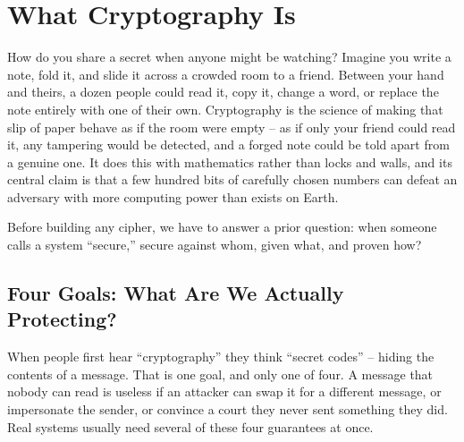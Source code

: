 \chapter{What Cryptography Is}

How do you share a secret when anyone might be watching? Imagine you write a note, fold it, and slide it across a crowded room to a friend. Between your hand and theirs, a dozen people could read it, copy it, change a word, or replace the note entirely with one of their own. Cryptography is the science of making that slip of paper behave as if the room were empty -- as if only your friend could read it, any tampering would be detected, and a forged note could be told apart from a genuine one. It does this with mathematics rather than locks and walls, and its central claim is that a few hundred bits of carefully chosen numbers can defeat an adversary with more computing power than exists on Earth.

Before building any cipher, we have to answer a prior question: when someone calls a system ``secure,'' secure against whom, given what, and proven how?

\chapterline

\section{Four Goals: What Are We Actually Protecting?}
\label{ch01:four-goals}

When people first hear ``cryptography'' they think ``secret codes'' -- hiding the contents of a message. That is one goal, and only one of four. A message that nobody can read is useless if an attacker can swap it for a different message, or impersonate the sender, or convince a court they never sent something they did. Real systems usually need several of these four guarantees at once.

